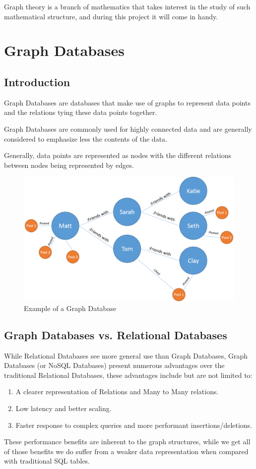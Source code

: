 \documentclass[]{report}
\begin{document}
	Graph theory is a branch of mathematics that takes interest in the study of such mathematical structure, and during this project it will come in handy.
	\newpage
	\section{Graph Databases}
	\subsection{Introduction}
	Graph Databases are databases that make use of graphs to represent data points and the relations tying these data points together.
	
	Graph Databases are commonly used for highly connected data and are generally considered to emphasize less the contents of the data.
	
	Generally, data points are represented as nodes with the different relations between nodes being represented by edges.
	\begin{figure}[!htb]
		\centering
		\includegraphics[width=1\textwidth]{graphDB.png}
		\caption{Example of a Graph Database}
	\end{figure}
	\subsection{Graph Databases vs. Relational Databases}
	While Relational Databases see more general use than Graph Databases, Graph Databases (or NoSQL Databases) present numerous advantages over the traditional Relational Databases, these advantages include but are not limited to:
	\begin{enumerate}
		\item A clearer representation of Relations and Many to Many relations.
		\item Low latency and better scaling.
		\item Faster response to complex queries and more performant insertions/deletions.
	\end{enumerate}
	These performance benefits are inherent to the graph structures, while we get all of those benefits we do suffer from a weaker data representation when compared with traditional SQL tables.
	\newpage
\end{document}
